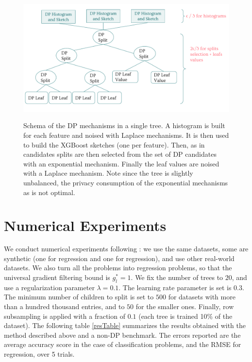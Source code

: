 \documentclass{article}
\theoremstyle{definition}
\begin{document}
\begin{figure}[h]
\centering 
\includegraphics[scale=0.7]{figs/schema_mechanisms.pdf}
\label{sketchAccuracy}
\caption{Schema of the DP mechanisms in a single tree. A histogram is built for each feature and noised with Laplace mechanisms. It is then used to build the XGBoost sketches (one per feature). Then, as in \cite{li2020privacy} candidates splits are then selected from the set of DP candidates with an exponential mechanism. Finally the leaf values are noised with a Laplace mechanism. Note since the tree is slightly unbalanced, the privacy consumption of the exponential mechanisms as is not optimal.} 
\end{figure}

\section{Numerical Experiments}

\label{numExpSection}

We conduct numerical experiments following \cite{li2020privacy}: we use the same datasets, some are synthetic (one for regression and one for regression), and use other real-world datasets. We also turn all the problems into regression problems, so that the universal gradient filtering bound is $g_l^* = 1$. We fix the number of trees to $20$, and use a regularization parameter $\lambda = 0.1$. The learning rate parameter is set is $0.3$. The minimum number of children to split is set to $500$ for datasets with more than a hundred thousand entries, and to $50$ for the smaller ones. Finally, row subsampling is applied with a fraction of $0.1$ (each tree is trained 10\% of the dataset). The following table \ref{resTable} summarizes the results obtained with the method described above and a non-DP benchmark. The errors reported are the average accuracy score in the case of classification problems, and the RMSE for regression, over 5 trials. \smallskip 
\end{document}
